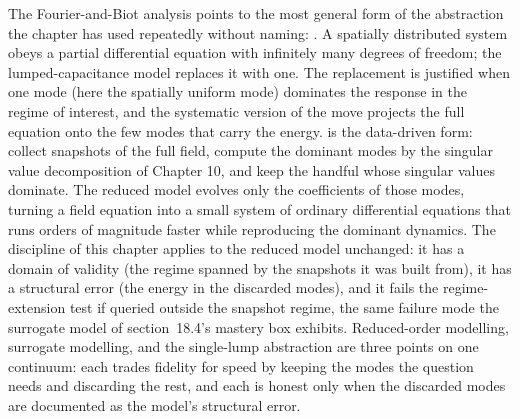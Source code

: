 \begin{mastery}
The Fourier-and-Biot analysis points to the most general form of the
abstraction the chapter has used repeatedly without naming: . A spatially distributed system obeys a partial
differential equation with infinitely many degrees of freedom; the
lumped-capacitance model replaces it with one. The replacement is justified
when one mode (here the spatially uniform mode) dominates the response in
the regime of interest, and the systematic version of the move projects the
full equation onto the few modes that carry the energy.  is the data-driven form: collect snapshots of the
full field, compute the dominant modes by the singular value decomposition
of Chapter 10, and keep the handful whose singular values dominate. The
reduced model evolves only the coefficients of those modes, turning a
field equation into a small system of ordinary differential equations that
runs orders of magnitude faster while reproducing the dominant dynamics.
The discipline of this chapter applies to the reduced model unchanged: it
has a domain of validity (the regime spanned by the snapshots it was built
from), it has a structural error (the energy in the discarded modes), and
it fails the regime-extension test if queried outside the snapshot regime,
the same failure mode the surrogate model of section~18.4's mastery box
exhibits. Reduced-order modelling, surrogate modelling, and the
single-lump abstraction are three points on one continuum: each trades
fidelity for speed by keeping the modes the question needs and discarding
the rest, and each is honest only when the discarded modes are documented
as the model's structural error.
\end{mastery}

